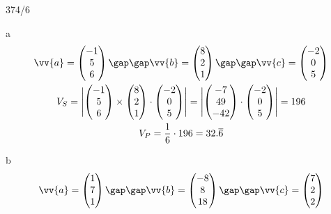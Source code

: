 \begin{exercise}{374/6}
  \item [a]
  \begin{gather*}
    \vv{a} = \begin{pmatrix}-1 \\ 5 \\ 6\end{pmatrix} \gap\gap \vv{b} = \begin{pmatrix}8 \\ 2 \\ 1\end{pmatrix} \gap\gap \vv{c} = \begin{pmatrix}-2 \\ 0 \\ 5\end{pmatrix} \\
    V_S = \Biggl|\begin{pmatrix}-1 \\ 5 \\ 6\end{pmatrix} \times \begin{pmatrix}8 \\ 2 \\ 1\end{pmatrix} \cdot \begin{pmatrix}-2 \\ 0 \\ 5\end{pmatrix}\Biggr| = \Biggl|\begin{pmatrix}-7 \\ 49 \\ -42\end{pmatrix} \cdot \begin{pmatrix}-2 \\ 0 \\ 5\end{pmatrix}\Biggr| = 196 \\
    V_P = \frac{1}{6} \cdot 196 = 32.\overline{6}
  \end{gather*}
  \item [b]
  \begin{gather*}
    \vv{a} = \begin{pmatrix}1 \\ 7 \\ 1\end{pmatrix} \gap\gap \vv{b} = \begin{pmatrix}-8 \\ 8 \\ 18\end{pmatrix} \gap\gap \vv{c} = \begin{pmatrix}7 \\ 2 \\ 2\end{pmatrix} \\

\end{gather*}
\end{exercise}
